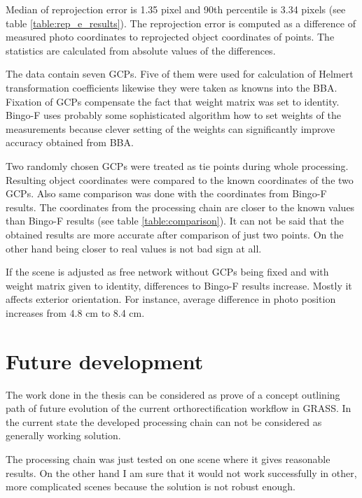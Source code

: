 \documentclass[a4paper,12pt]{article}
\begin{document}
Median of reprojection error is 1.35 pixel and 90th percentile is 3.34 pixels (see table \ref{table:rep_e_results}).
The reprojection error is computed as a difference of measured photo coordinates to 
reprojected object coordinates of points. The statistics are calculated from absolute values of the differences. 

The data contain seven GCPs. Five of them were used for calculation of  Helmert transformation coefficients
likewise they were taken as knowns into the BBA. 
Fixation of GCPs compensate the fact that weight matrix was set to identity. 
Bingo-F uses probably some sophisticated algorithm how to set weights of the measurements because 
clever setting of the weights can significantly improve accuracy obtained from BBA.

Two randomly chosen GCPs were treated as tie points during whole processing. 
Resulting object coordinates were compared to the known coordinates of the two GCPs.
Also same comparison was done with the coordinates from Bingo-F results. 
The coordinates from the processing chain are closer to the known values 
than Bingo-F results (see table \ref{table:comparison}). 
It can not be said that the obtained results 
are more accurate after comparison of just two points. On the other 
hand being closer to real values is  not bad sign at all.
 
If the scene is adjusted as free network without GCPs being fixed and with 
weight matrix given to identity, differences to Bingo-F results increase. 
Mostly it affects exterior orientation.
For instance, average difference in photo position increases from 4.8 cm to 8.4 cm.


\section{Future development}

The work done in the thesis can be considered as prove of a concept
outlining path of future evolution of the current orthorectification workflow in GRASS. 
In the current state the developed 
processing chain can not be considered as generally working solution.

The processing chain was just tested 
 on one scene where it gives reasonable results. On the other hand 
I am sure that it would not work successfully in other, more complicated scenes because 
the solution is not robust enough.
\end{document}
